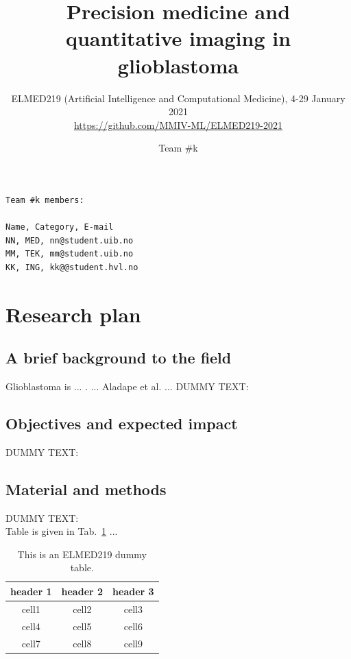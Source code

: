 \documentclass[11pt]{article}
\title{Precision medicine and quantitative imaging in glioblastoma}
\author{ELMED219 (Artificial Intelligence and Computational Medicine), 4-29 January 2021\\
{\footnotesize \url{https://github.com/MMIV-ML/ELMED219-2021}}}
\date{Team \#k}
\begin{document}
\maketitle

\begin{scriptsize}
\begin{verbatim}
Team #k members:

Name, Category, E-mail	
NN, MED, nn@student.uib.no
MM, TEK, mm@student.uib.no
KK, ING, kk@@student.hvl.no

\end{verbatim}
\end{scriptsize}

\vspace{3mm}
\section{Research plan} %

\vspace{3mm}

\subsection{A brief background to the field}

Glioblastoma is ...  \cite{Louis2019}. ...  Aladape et al. \cite{Aldape2019} ... 
DUMMY TEXT:
\lipsum[5]

\subsection{Objectives and expected impact}

DUMMY TEXT:
\lipsum[5]


\subsection{Material and methods}

DUMMY TEXT:
\lipsum[6] \\

Table is given in Tab.~\ref{tab:elmed219-dummy} ...

\begin{table}[H]
\begin{center}
\begin{tabular}{ |c|c|c| } 
 \hline
 header 1 & header 2 & header 3 \\ 
 \hline
 cell1 & cell2 & cell3 \\ 
 cell4 & cell5 & cell6 \\ 
 cell7 & cell8 & cell9 \\ 
 \hline
\end{tabular}
\end{center}
\caption{This is an ELMED219 dummy table.}
\label{tab:elmed219-dummy}
\end{table}
\end{document}
